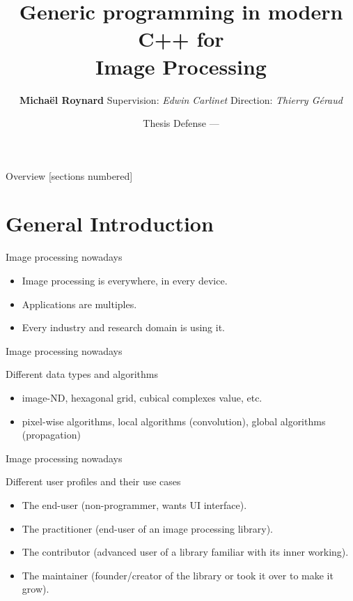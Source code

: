 \documentclass[12pt,aspectratio=169]{beamer}
\title{Generic programming in modern C++ for\\ Image Processing}
\date{Thesis Defense --- \displaydate{dateSoutenance}}
\author{\textbf{Michaël Roynard} \hspace{1cm} Supervision: \emph{Edwin Carlinet} \hspace{1cm} Direction: \emph{Thierry
Géraud}}
\institute{EPITA Research Laboratory (LRE) --- Le Kremlin Bicêtre, France}
\begin{document}
\maketitle

\begin{frame}{Overview}
  [sections numbered]
  \tableofcontents%
\end{frame}

%
%
%

\section[General Introduction]{General Introduction}

\begin{frame}[fragile]{Image processing nowadays}
  \begin{itemize}
    \item Image processing is everywhere, in every device.
    \item Applications are multiples.
    \item Every industry and research domain is using it.
  \end{itemize}
\end{frame}

\begin{frame}[fragile]{Image processing nowadays}
  \begin{alertblock}{Different data types and algorithms}
    \begin{itemize}
      \item image-ND, hexagonal grid, cubical complexes value, etc.
      \item pixel-wise algorithms, local algorithms (convolution), global algorithms (propagation)
    \end{itemize}
  \end{alertblock}
\end{frame}

\begin{frame}[fragile]{Image processing nowadays}
  \begin{alertblock}{Different user profiles and their use cases}
    \begin{itemize}
      \item The end-user (non-programmer, wants UI interface).
      \item The practitioner (end-user of an image processing library).
      \item The contributor (advanced user of a library familiar with its inner working).
      \item The maintainer (founder/creator of the library or took it over to make it grow).
    \end{itemize}
  \end{alertblock}
\end{frame}
\end{document}
